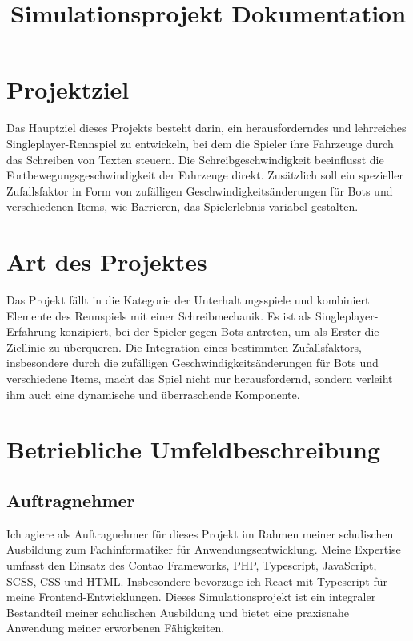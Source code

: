 \documentclass{article}
\begin{document}
\title{Simulationsprojekt Dokumentation}

\maketitle

\section{Projektziel}
Das Hauptziel dieses Projekts besteht darin, ein herausforderndes und lehrreiches Singleplayer-Rennspiel zu entwickeln, bei dem die Spieler ihre Fahrzeuge durch das Schreiben von Texten steuern. Die Schreibgeschwindigkeit beeinflusst die Fortbewegungsgeschwindigkeit der Fahrzeuge direkt. Zusätzlich soll ein spezieller Zufallsfaktor in Form von zufälligen Geschwindigkeitsänderungen für Bots und verschiedenen Items, wie Barrieren, das Spielerlebnis variabel gestalten.

\section{Art des Projektes}
Das Projekt fällt in die Kategorie der Unterhaltungsspiele und kombiniert Elemente des Rennspiels mit einer Schreibmechanik. Es ist als Singleplayer-Erfahrung konzipiert, bei der Spieler gegen Bots antreten, um als Erster die Ziellinie zu überqueren. Die Integration eines bestimmten Zufallsfaktors, insbesondere durch die zufälligen Geschwindigkeitsänderungen für Bots und verschiedene Items, macht das Spiel nicht nur herausfordernd, sondern verleiht ihm auch eine dynamische und überraschende Komponente.

\section{Betriebliche Umfeldbeschreibung}

\subsection{Auftragnehmer}
Ich agiere als Auftragnehmer für dieses Projekt im Rahmen meiner schulischen Ausbildung zum Fachinformatiker für Anwendungsentwicklung. Meine Expertise umfasst den Einsatz des Contao Frameworks, PHP, Typescript, JavaScript, SCSS, CSS und HTML. Insbesondere bevorzuge ich React mit Typescript für meine Frontend-Entwicklungen. Dieses Simulationsprojekt ist ein integraler Bestandteil meiner schulischen Ausbildung und bietet eine praxisnahe Anwendung meiner erworbenen Fähigkeiten.
\end{document}
